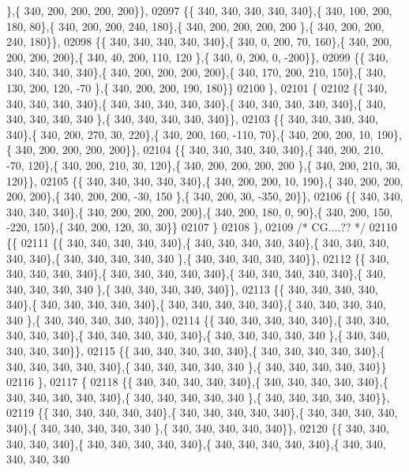 \begin{DoxyCode}
      \},\{ 340, 200, 200, 200, 200\}\},
02097 \{\{ 340, 340, 340, 340, 340\},\{ 340, 100, 200, 180,  80\},\{ 340, 200, 200, 240, 180\},\{ 340, 200, 200, 200, 200
      \},\{ 340, 200, 200, 240, 180\}\},
02098 \{\{ 340, 340, 340, 340, 340\},\{ 340,   0, 200,  70, 160\},\{ 340, 200, 200, 200, 200\},\{ 340,  40, 200, 110, 120
      \},\{ 340,   0, 200,   0, -200\}\},
02099 \{\{ 340, 340, 340, 340, 340\},\{ 340, 200, 200, 200, 200\},\{ 340, 170, 200, 210, 150\},\{ 340, 130, 200, 120, -70
      \},\{ 340, 200, 200, 190, 180\}\}
02100 \},
02101 \{
02102 \{\{ 340, 340, 340, 340, 340\},\{ 340, 340, 340, 340, 340\},\{ 340, 340, 340, 340, 340\},\{ 340, 340, 340, 340, 340
      \},\{ 340, 340, 340, 340, 340\}\},
02103 \{\{ 340, 340, 340, 340, 340\},\{ 340, 200, 270,  30, 220\},\{ 340, 200, 160, -110,  70\},\{ 340, 200, 200,  10, 
      190\},\{ 340, 200, 200, 200, 200\}\},
02104 \{\{ 340, 340, 340, 340, 340\},\{ 340, 200, 210, -70, 120\},\{ 340, 200, 210,  30, 120\},\{ 340, 200, 200, 200, 200
      \},\{ 340, 200, 210,  30, 120\}\},
02105 \{\{ 340, 340, 340, 340, 340\},\{ 340, 200, 200,  10, 190\},\{ 340, 200, 200, 200, 200\},\{ 340, 200, 200, -30, 150
      \},\{ 340, 200,  30, -350,  20\}\},
02106 \{\{ 340, 340, 340, 340, 340\},\{ 340, 200, 200, 200, 200\},\{ 340, 200, 180,   0,  90\},\{ 340, 200, 150, -220, 
      150\},\{ 340, 200, 120,  30,  30\}\}
02107 \}
02108 \},
02109 \textcolor{comment}{/* CG....?? */}
02110 \{\{
02111 \{\{ 340, 340, 340, 340, 340\},\{ 340, 340, 340, 340, 340\},\{ 340, 340, 340, 340, 340\},\{ 340, 340, 340, 340, 340
      \},\{ 340, 340, 340, 340, 340\}\},
02112 \{\{ 340, 340, 340, 340, 340\},\{ 340, 340, 340, 340, 340\},\{ 340, 340, 340, 340, 340\},\{ 340, 340, 340, 340, 340
      \},\{ 340, 340, 340, 340, 340\}\},
02113 \{\{ 340, 340, 340, 340, 340\},\{ 340, 340, 340, 340, 340\},\{ 340, 340, 340, 340, 340\},\{ 340, 340, 340, 340, 340
      \},\{ 340, 340, 340, 340, 340\}\},
02114 \{\{ 340, 340, 340, 340, 340\},\{ 340, 340, 340, 340, 340\},\{ 340, 340, 340, 340, 340\},\{ 340, 340, 340, 340, 340
      \},\{ 340, 340, 340, 340, 340\}\},
02115 \{\{ 340, 340, 340, 340, 340\},\{ 340, 340, 340, 340, 340\},\{ 340, 340, 340, 340, 340\},\{ 340, 340, 340, 340, 340
      \},\{ 340, 340, 340, 340, 340\}\}
02116 \},
02117 \{
02118 \{\{ 340, 340, 340, 340, 340\},\{ 340, 340, 340, 340, 340\},\{ 340, 340, 340, 340, 340\},\{ 340, 340, 340, 340, 340
      \},\{ 340, 340, 340, 340, 340\}\},
02119 \{\{ 340, 340, 340, 340, 340\},\{ 340, 340, 340, 340, 340\},\{ 340, 340, 340, 340, 340\},\{ 340, 340, 340, 340, 340
      \},\{ 340, 340, 340, 340, 340\}\},
02120 \{\{ 340, 340, 340, 340, 340\},\{ 340, 340, 340, 340, 340\},\{ 340, 340, 340, 340, 340\},\{ 340, 340, 340, 340, 340

\end{DoxyCode}
